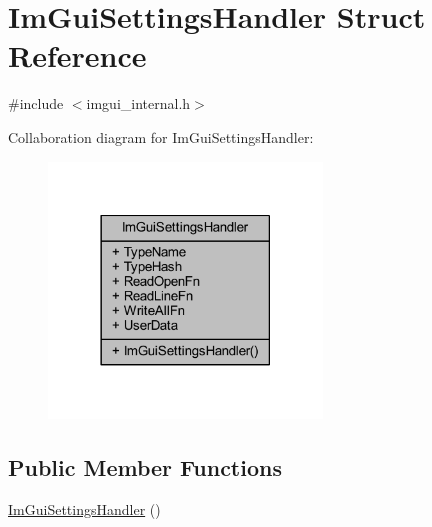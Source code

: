 \hypertarget{struct_im_gui_settings_handler}{}\section{Im\+Gui\+Settings\+Handler Struct Reference}
\label{struct_im_gui_settings_handler}


{\ttfamily \#include $<$imgui\+\_\+internal.\+h$>$}



Collaboration diagram for Im\+Gui\+Settings\+Handler\+:
\nopagebreak
\begin{figure}[H]
\begin{center}
\leavevmode
\includegraphics[width=206pt]{struct_im_gui_settings_handler__coll__graph}
\end{center}
\end{figure}
\subsection*{Public Member Functions}
\begin{DoxyCompactItemize}
\item 
\mbox{\hyperlink{struct_im_gui_settings_handler_ab84610a000c843d4e303e41e260fb1df}{Im\+Gui\+Settings\+Handler}} ()
\end{DoxyCompactItemize}
